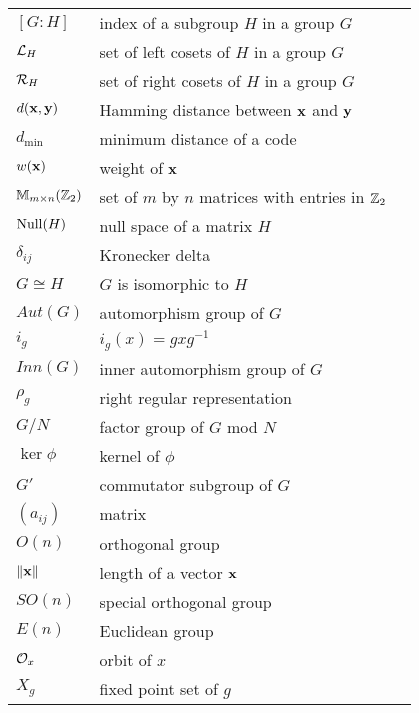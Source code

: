 \begin{center}
\begin{longtable}{llr}
%
$[G:H]$ & index of a subgroup $H$ in a group $G$ & \pageref{indexofasubgroup}  \\
%
${\cal L}_H$ & set of left cosets of $H$ in a group $G$ & \pageref{notesetleft} \\
%
${\cal R}_H$ & set of right cosets of $H$ in a group $G$ & \pageref{notesetright}  \\
%
$d({\bold x}, {\bold y})$ & Hamming distance between ${\bold x}$ and ${\bold y}$ & \pageref{noteHammingdist} \\
%
$d_{\min}$ & minimum distance of a code & \pageref{notemindist}\\
%
$w({\bold x})$ & weight of ${\bold x}$ & \pageref{noteweight} \\
%
${\Bbb M}_{m \times n}({\Bbb Z}_2)$ & set of $m$ by $n$ matrices with entries in ${\Bbb Z}_2$ & \pageref{notembyn} \\
%
${\rm Null}(H)$ & null space of a matrix $H$ & \pageref{notenull} \\
%
$\delta_{ij}$ & Kronecker delta & \pageref{notekron} \\
%
$G \cong H$ & $G$ is isomorphic to $H$ & \pageref{noteisomorph} \\
%
$Aut(G)$ & automorphism group of $G$ & \pageref{noteauto} \\
%
$i_g$ & $i_g(x) = gxg^{-1}$ & \pageref{noteinner} \\
%
$Inn(G)$ & inner automorphism group of $G$ & \pageref{noteinneraut} \\
%
$\rho_g$ & right regular representation & \pageref{noterightreg} \\
%
$G/N$ & factor group of $G$ mod $N$ & \pageref{notefactor} \\
%
$\ker \phi$ & kernel of $\phi$ & \pageref{kernelofphi} \\
%
$G'$ & commutator subgroup of $G$ & \pageref{commutatorsubgroup} \\
%
$(a_{ij})$ & matrix & \pageref{matrixnote} \\
%
$O(n)$ & orthogonal group & \pageref{noteorthogonal} \\
%
$\| {\bold x} \|$ & length of a vector ${\bold x}$ & \pageref{notelengthvect} \\
%
$SO(n)$ & special orthogonal group & \pageref{notespecialorthog} \\
%
$E(n)$ & Euclidean group & \pageref{noteeuclidgroup} \\
%
${\cal O}_x$ & orbit of $x$ & \pageref{noteorbit} \\
%
$X_g$ & fixed point set of $g$ & \pageref{notefixed} \\

\end{longtable}
\end{center}
